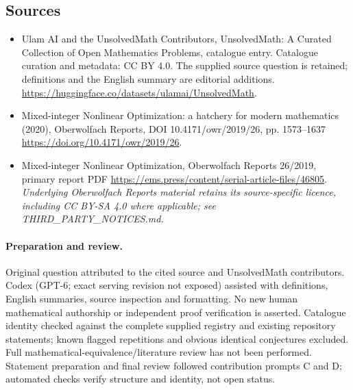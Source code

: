 \documentclass[11pt]{article}
\begin{document}
\subsection{Sources}
\begin{itemize}
\item[\hypertarget{source:statement:1}{S1}] Ulam AI and the UnsolvedMath Contributors, UnsolvedMath: A Curated Collection of Open Mathematics Problems, catalogue entry. Catalogue curation and metadata: CC BY 4.0. The supplied source question is retained; definitions and the English summary are editorial additions.
\url{https://huggingface.co/datasets/ulamai/UnsolvedMath}.
\item[\hypertarget{source:statement:2}{S2}] Mixed-integer Nonlinear Optimization: a hatchery for modern mathematics (2020), Oberwolfach Reports, DOI 10.4171/owr/2019/26, pp. 1573--1637
\url{https://doi.org/10.4171/owr/2019/26}.
\item[\hypertarget{source:statement:3}{S3}] Mixed-integer Nonlinear Optimization, Oberwolfach Reports 26/2019, primary report PDF
\url{https://ems.press/content/serial-article-files/46805}.
\textit{Underlying Oberwolfach Reports material retains its source-specific licence, including CC BY-SA 4.0 where applicable; see THIRD\_PARTY\_NOTICES.md.}
\end{itemize}
\paragraph{Preparation and review.}
Original question attributed to the cited source and UnsolvedMath contributors. Codex (GPT-6; exact serving revision not exposed) assisted with definitions, English summaries, source inspection and formatting. No new human mathematical authorship or independent proof verification is asserted. Catalogue identity checked against the complete supplied registry and existing repository statements; known flagged repetitions and obvious identical conjectures excluded. Full mathematical-equivalence/literature review has not been performed. Statement preparation and final review followed contribution prompts C and D; automated checks verify structure and identity, not open status.
\label{end:statement}
\end{document}
